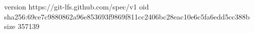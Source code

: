 version https://git-lfs.github.com/spec/v1
oid sha256:69ce7c9880862a96e853693f9869f811cc2406bc28eac10e6c5fa6edd5cc388b
size 357139
